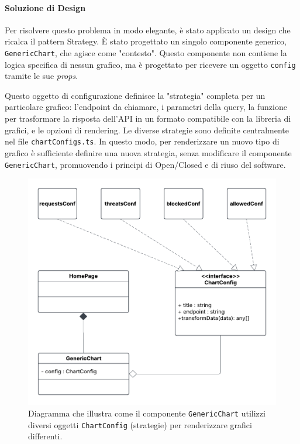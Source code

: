 \documentclass[12pt,a4paper,openright,twoside]{book}
\begin{document}
\paragraph{Soluzione di Design}
Per risolvere questo problema in modo elegante, è stato applicato un design che ricalca il pattern Strategy. È stato progettato un singolo componente generico, \texttt{GenericChart}, che agisce come "contesto". Questo componente non contiene la logica specifica di nessun grafico, ma è progettato per ricevere un oggetto \texttt{config} tramite le sue \textit{props}.

Questo oggetto di configurazione definisce la "strategia" completa per un particolare grafico: l'endpoint da chiamare, i parametri della query, la funzione per trasformare la risposta dell'API in un formato compatibile con la libreria di grafici, e le opzioni di rendering. Le diverse strategie sono definite centralmente nel file \texttt{chartConfigs.ts}. In questo modo, per renderizzare un nuovo tipo di grafico è sufficiente definire una nuova strategia, senza modificare il componente \texttt{GenericChart}, promuovendo i principi di Open/Closed e di riuso del software.

\begin{figure}[H]
    \centering
    \includegraphics[width=\textwidth]{figures/strategy.pdf}
    \caption{Diagramma che illustra come il componente \texttt{GenericChart} utilizzi diversi oggetti \texttt{ChartConfig} (strategie) per renderizzare grafici differenti.}
    \label{fig:strategy_frontend_uml}
\end{figure}
\end{document}
